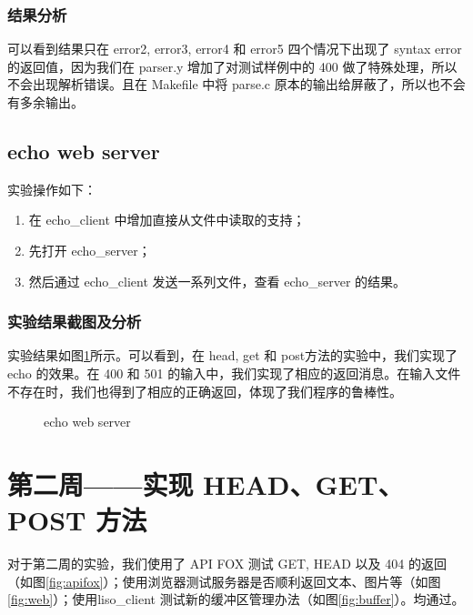 \subsubsection*{结果分析}

可以看到结果只在 error2, error3, error4 和 error5 四个情况下出现了 syntax error 的返回值，因为我们在 parser.y 增加了对测试样例中的 400 做了特殊处理，所以不会出现解析错误。且在 Makefile 中将 parse.c 原本的输出给屏蔽了，所以也不会有多余输出。

\subsection{echo web server}

实验操作如下：
\begin{enumerate}
    \item 在 echo\_client 中增加直接从文件中读取的支持；
    \item 先打开 echo\_server；
    \item 然后通过 echo\_client 发送一系列文件，查看 echo\_server 的结果。
\end{enumerate}

\subsubsection*{实验结果截图及分析}
实验结果如图\ref{fig:echo web server}所示。可以看到，在 head, get 和 post方法的实验中，我们实现了 echo 的效果。在 400 和 501 的输入中，我们实现了相应的返回消息。在输入文件不存在时，我们也得到了相应的正确返回，体现了我们程序的鲁棒性。

\begin{figure}[htbp!]
    \centering
    \caption{echo web server}\label{fig:echo web server}
    \vspace{-1em}
\end{figure}

\section{第二周——实现 HEAD、GET、POST 方法}

对于第二周的实验，我们使用了 API FOX 测试 GET, HEAD 以及 404 的返回（如图\ref{fig:apifox}）；使用浏览器测试服务器是否顺利返回文本、图片等（如图\ref{fig:web}）；使用liso\_client 测试新的缓冲区管理办法（如图\ref{fig:buffer}）。均通过。

